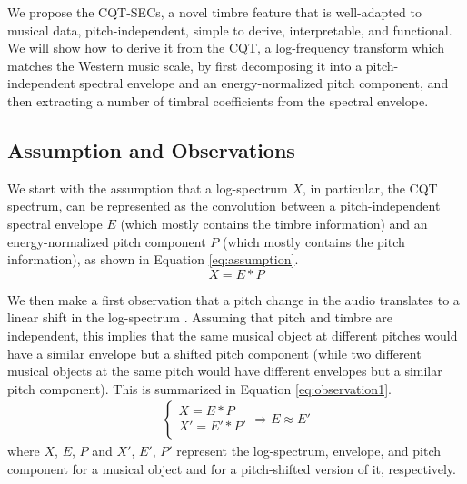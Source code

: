 \documentclass[journal]{IEEEtran}
\begin{document}
We propose the CQT-SECs, a novel timbre feature that is well-adapted to musical data, pitch-independent, simple to derive, interpretable, and functional. We will show how to derive it from the CQT, a log-frequency transform which matches the Western music scale, by first decomposing it into a pitch-independent spectral envelope and an energy-normalized pitch component, and then extracting a number of timbral coefficients from the spectral envelope. 

\subsection{Assumption and Observations}

We start with the assumption that a log-spectrum $X$, in particular, the CQT spectrum, can be represented as the convolution between a pitch-independent spectral envelope $E$ (which mostly contains the timbre information) and an energy-normalized pitch component $P$ (which mostly contains the pitch information), as shown in Equation \ref{eq:assumption}.
\begin{equation}
\label{eq:assumption}
X = E * P
\end{equation}

We then make a first observation that a pitch change in the audio translates to a linear shift in the log-spectrum \cite{brown1991, brown1992}. Assuming that pitch and timbre are independent, this implies that the same musical object at different pitches would have a similar envelope but a shifted pitch component (while two different musical objects at the same pitch would have different envelopes but a similar pitch component). This is summarized in Equation \ref{eq:observation1}.
\begin{equation}
\label{eq:observation1}
\begin{split}
\begin{cases}
X = E * P \\
X' = E' * P' \\
\end{cases}
\Rightarrow E \approx E'
\end{split}
\end{equation}
where $X$, $E$, $P$ and $X'$, $E'$, $P'$ represent the log-spectrum, envelope, and pitch component for a musical object and for a pitch-shifted version of it, respectively.
\end{document}

